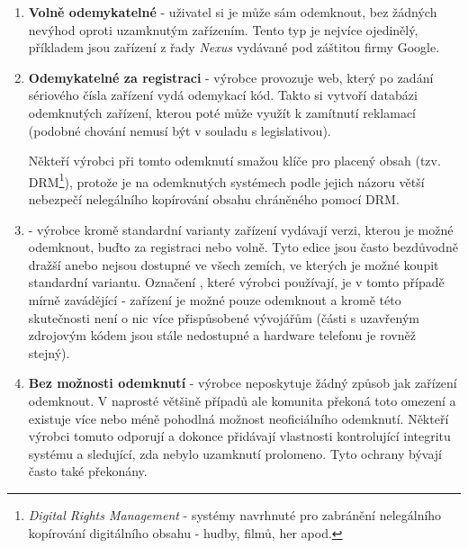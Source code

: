 \documentclass[12pt, a4paper, oneside]{article}
\newcommand{\B}{\textbf} %
\newcommand{\It}{\textit}  %
\begin{document}
\begin{enumerate}
    \item \B{Volně odemykatelné} - uživatel si je může sám odemknout, bez žádných nevýhod oproti uzamknutým zařízením. Tento typ je nejvíce ojedinělý, příkladem jsou zařízení z řady \It{Nexus} vydávané pod záštitou firmy Google.
    
    \item \B{Odemykatelné za registraci} - výrobce provozuje web, který po zadání sériového čísla zařízení vydá odemykací kód. Takto si vytvoří databázi odemknutých zařízení, kterou poté může využít k zamítnutí reklamací (podobné chování nemusí být v souladu s legislativou).
    
    Někteří výrobci při tomto odemknutí smažou klíče pro placený obsah (tzv. DRM\footnote{\It{Digital Rights Management} - systémy navrhnuté pro zabránění nelegálního kopírování digitálního obsahu - hudby, filmů, her apod.}), protože je na odemknutých systémech podle jejich názoru větší nebezpečí nelegálního kopírování obsahu chráněného pomocí DRM.
    
    \item \B{} - výrobce kromě standardní varianty zařízení vydávají verzi, kterou je možné odemknout, buďto za registraci nebo volně. Tyto edice jsou často bezdůvodně dražší anebo nejsou dostupné ve všech zemích, ve kterých je možné koupit standardní variantu. Označení , které výrobci používají, je v tomto případě mírně zavádějící - zařízení je možné pouze odemknout a kromě této skutečnosti není o nic více přispůsobené vývojářům (části s uzavřeným zdrojovým kódem jsou stále nedostupné a hardware telefonu je rovněž stejný).

    \item \B{Bez možnosti odemknutí} - výrobce neposkytuje žádný způsob jak zařízení odemknout. V naprosté většině případů ale komunita překoná toto omezení a existuje více nebo méně pohodlná možnost neoficiálního odemknutí. Někteří výrobci tomuto odporují a dokonce přidávají vlastnosti kontrolující integritu systému a sledující, zda nebylo uzamknutí prolomeno. Tyto ochrany bývají často také překonány.
    
\end{enumerate}

\newpage
\end{document}
